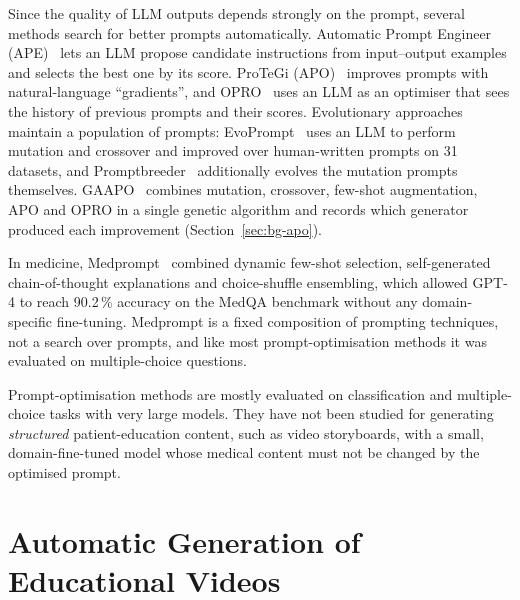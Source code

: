 Since the quality of LLM outputs depends strongly on the prompt, several
methods search for better prompts automatically. Automatic Prompt Engineer
(APE)~\cite{zhou2023large} lets an LLM propose candidate instructions from
input--output examples and selects the best one by its score. ProTeGi
(APO)~\cite{pryzant2023automatic} improves prompts with natural-language
``gradients'', and OPRO~\cite{yang2024large} uses an LLM as an optimiser that
sees the history of previous prompts and their scores. Evolutionary
approaches maintain a population of prompts: EvoPrompt~\cite{guo2024connecting}
uses an LLM to perform mutation and crossover and improved over
human-written prompts on 31 datasets, and Promptbreeder~\cite{fernando2024promptbreeder}
additionally evolves the mutation prompts themselves. GAAPO~\cite{secheresse2025gaapo}
combines mutation, crossover, few-shot augmentation, APO and OPRO in a single
genetic algorithm and records which generator produced each improvement
(Section~\ref{sec:bg-apo}).

In medicine, Medprompt~\cite{nori2023can} combined dynamic few-shot
selection, self-generated chain-of-thought explanations and choice-shuffle
ensembling, which allowed GPT-4 to reach 90.2\,\% accuracy on the MedQA
benchmark without any domain-specific fine-tuning. Medprompt is a fixed
composition of prompting techniques, not a search over prompts, and like most
prompt-optimisation methods it was evaluated on multiple-choice questions.

\begin{rwgap}
Prompt-optimisation methods are mostly evaluated on classification and
multiple-choice tasks with very large models. They have not been studied for
generating \emph{structured} patient-education content, such as video
storyboards, with a small, domain-fine-tuned model whose medical content must
not be changed by the optimised prompt.
\end{rwgap}

\section{Automatic Generation of Educational Videos}
\label{sec:rw-video}

